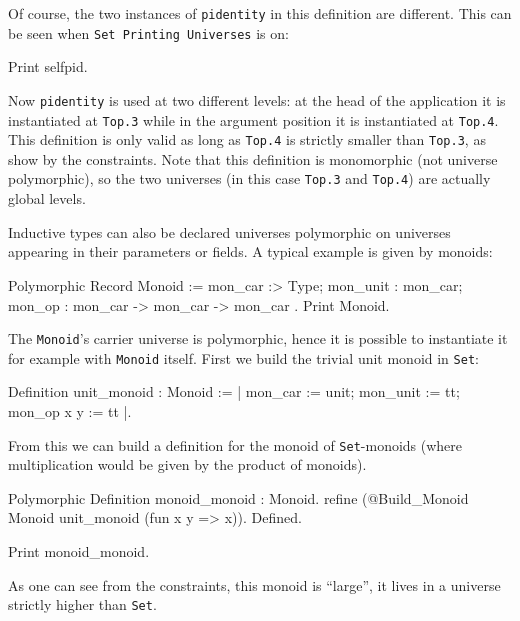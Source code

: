 Of course, the two instances of \texttt{pidentity} in this definition
are different. This can be seen when \texttt{Set Printing Universes} is
on:

\begin{coq_example}
Print selfpid.
\end{coq_example}

Now \texttt{pidentity} is used at two different levels: at the head of
the application it is instantiated at \texttt{Top.3} while in the
argument position it is instantiated at \texttt{Top.4}. This definition
is only valid as long as \texttt{Top.4} is strictly smaller than
\texttt{Top.3}, as show by the constraints. Note that this definition is
monomorphic (not universe polymorphic), so the two universes
(in this case \texttt{Top.3} and \texttt{Top.4}) are actually global levels.

Inductive types can also be declared universes polymorphic on universes
appearing in their parameters or fields. A typical example is given by
monoids:

\begin{coq_example}
Polymorphic Record Monoid := { mon_car :> Type; mon_unit : mon_car;
  mon_op : mon_car -> mon_car -> mon_car }.
Print Monoid.
\end{coq_example}

The \texttt{Monoid}'s carrier universe is polymorphic, hence it is
possible to instantiate it for example with \texttt{Monoid} itself.
First we build the trivial unit monoid in \texttt{Set}:
\begin{coq_example}
Definition unit_monoid : Monoid :=
  {| mon_car := unit; mon_unit := tt; mon_op x y := tt |}.
\end{coq_example}

From this we can build a definition for the monoid of
\texttt{Set}-monoids (where multiplication would be given by the product
of monoids).

\begin{coq_example*}
Polymorphic Definition monoid_monoid : Monoid.
  refine (@Build_Monoid Monoid unit_monoid (fun x y => x)).
Defined.
\end{coq_example*}
\begin{coq_example}
Print monoid_monoid.
\end{coq_example}

As one can see from the constraints, this monoid is ``large'', it lives
in a universe strictly higher than \texttt{Set}.


